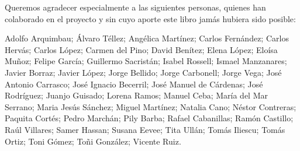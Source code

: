 Queremos agradecer especialmente a las siguientes personas, quienes han colaborado en el proyecto y sin cuyo aporte este libro jamás hubiera sido posible:

\bigskip
Adolfo Arquimbau; Álvaro Téllez; Angélica Martínez; Carlos Fernández; Carlos Hervás; Carlos López; Carmen del Pino; David Benítez; Elena López; Eloísa Muñoz; Felipe García; Guillermo Sacristán; Isabel Rossell; Ismael Manzanares; Javier Borraz; Javier López; Jorge Bellido; Jorge Carbonell; Jorge Vega; José Antonio Carrasco; José Ignacio Becerril; José Manuel de Cárdenas; José Rodríguez; Juanjo Guisado; Lorena Ramos; Manuel Ceba; María del Mar Serrano; Maria Jesús Sánchez; Miguel Martínez; Natalia Cano; Néstor Contreras; Paquita Cortés; Pedro Marchán; Pily Barba; Rafael Cabanillas; Ramón Castillo; Raúl Villares; Samer Hassan; Susana Eevee; Tita Ullán; Tomás Iliescu; Tomás Ortiz; Toni Gómez; Toñi González; Vicente Ruiz.

\endinput